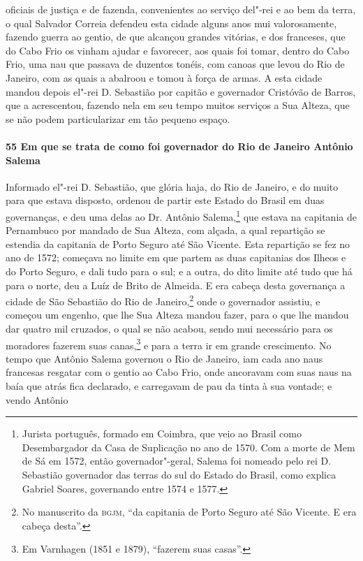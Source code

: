 \begin{linenumbers}
oficiais de justiça e de fazenda, convenientes ao serviço del"-rei e ao bem da terra, o
qual Salvador Correia defendeu esta cidade alguns anos mui valorosamente, fazendo guerra
ao gentio, de que alcançou grandes vitórias, e dos franceses, que do Cabo Frio os vinham
ajudar e favorecer, aos quais foi tomar, dentro do Cabo Frio, uma nau que passava de
duzentos tonéis, com canoas que levou do Rio de Janeiro, com as quais a abalroou e tomou à
força de armas. A esta cidade mandou depois el"-rei D. Sebastião por capitão e governador
Cristóvão de Barros, que a acrescentou, fazendo nela em seu tempo muitos serviços a Sua
Alteza, que se não podem particularizar em tão pequeno espaço.

\paragraph{55 Em que se trata de como foi governador do Rio de Janeiro Antônio Salema} \quad
Informado el"-rei D. Sebastião, que glória haja, do Rio de Janeiro, e do muito para que
estava disposto, ordenou de partir este Estado do Brasil em duas governanças, e deu uma
delas ao Dr. Antônio Salema,\footnote{ Jurista português, formado em Coimbra, que veio ao
Brasil como Desembargador da Casa de Suplicação no ano de 1570. Com a morte de Mem de Sá
em 1572, então governador"-geral, Salema foi nomeado pelo rei D. Sebastião governador das
terras do sul do Estado do Brasil, como explica Gabriel Soares, governando entre 1574 e
1577.} que estava na capitania de Pernambuco por mandado de Sua Alteza, com alçada, a
qual repartição se estendia da capitania de Porto Seguro até São Vicente. Esta repartição
se fez no ano de 1572; começava no limite em que partem as duas capitanias dos Ilheos e do
Porto Seguro, e dali tudo para o sul; e a outra, do dito limite até tudo que há para o
norte, deu a Luíz de Brito de Almeida. E era cabeça desta governança a cidade de São
Sebastião do Rio de Janeiro,\footnote{ No manuscrito da \textsc{bgjm}, ``da capitania de
Porto Seguro até São Vicente. E era cabeça desta''.} onde o governador assistiu, e começou
um engenho, que lhe Sua Alteza mandou fazer, para o que lhe mandou dar quatro mil
cruzados, o qual se não acabou, sendo mui necessário para os moradores fazerem suas
canas,\footnote{ Em Varnhagen (1851 e 1879), ``fazerem suas casas''.} e para a terra ir em
grande crescimento. No tempo que Antônio Salema governou o Rio de Janeiro, iam cada ano
naus francesas resgatar com o gentio ao Cabo Frio, onde ancoravam com suas naus na baía
que atrás fica declarado, e carregavam de pau da tinta à sua vontade; e vendo Antônio

\end{linenumbers}

